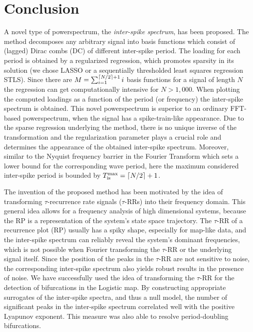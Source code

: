 \documentclass[entropy,article,submit,pdftex,moreauthors]{Definitions/mdpi}
\DeclarePairedDelimiter\ceil{\lceil}{\rceil}
\begin{document}

\section{Conclusion}\label{sec_tau_rr_conclusion}

A novel type of powerspectrum, the \textit{inter-spike spectrum}, has been proposed. The method decomposes any arbitrary signal into basis functions which consist of (lagged) Dirac 
combs (DC) of different inter-spike period. The loading for each period is obtained by a regularized regression, which promotes sparsity in its solution (we chose LASSO or a sequentially 
thresholded least squares regression STLS). Since there are 
$M = \sum_{i=1}^{\ceil*{N/2}+1}i$ basis functions for a signal of length $N$ the regression can get computationally intensive for $N>1,000$. When plotting the computed loadings as a function 
of the period (or frequency) the inter-spike spectrum is obtained. This novel powerspectrum is superior to an ordinary FFT-based powerspectrum, when the signal has a spike-train-like 
appearance. Due to the sparse regression underlying the method, there is no unique inverse of the transformation and the regularization parameter plays a crucial role and determines the 
appearance of the obtained inter-spike spectrum. Moreover, similar to the Nyquist frequency barrier in the Fourier Transform which sets a lower bound for the corresponding wave period, here 
the maximum considered inter-spike period is bounded by $T_{\text{is}}^{\text{max}} = \ceil*{N/2}+1$.

The invention of the proposed method has been motivated by the idea of transforming $\tau$-recurrence rate signals ($\tau$-RRs) into their frequency domain. 
This general idea \cite{Zbilut2008} allows for a frequency analysis of high dimensional systems, because the RP is a representation of the system's state space trajectory.   
The $\tau$-RR of a recurrence plot (RP) usually has a spiky shape, especially for map-like data, and the inter-spike spectrum can reliably reveal the system's dominant frequencies, 
which is not possible when Fourier transforming the $\tau$-RR or the underlying signal itself. Since the position of the peaks 
in the $\tau$-RR are not sensitive to noise, the corresponding inter-spike spectrum also yields robust results in the presence of noise. We have successfully used the idea 
of transforming the $\tau$-RR for the detection of bifurcations in the Logistic map. By constructing appropriate surrogates of the inter-spike spectra, and thus a null model, 
the number of significant peaks in the inter-spike spectrum correlated well with the positive Lyapunov exponent. This measure was also able to resolve period-doubling bifurcations. 
\end{document}
